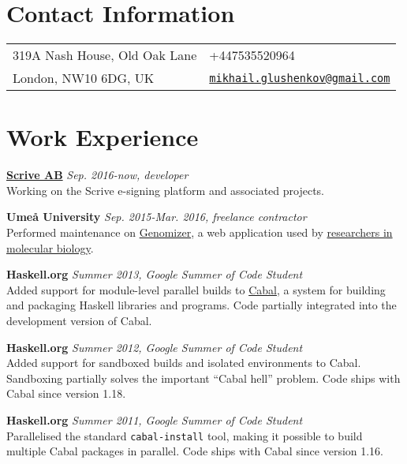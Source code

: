 \documentclass[margin,line]{res}
\begin{document}

\begin{resume}
\section{\sc Contact Information}
\vspace{.05in}
\begin{tabular}{@{}p{2in}p{4in}}
319A Nash House, Old Oak Lane&
+447535520964\\
London, NW10 6DG, UK&
\href{mailto:mikhail.glushenkov@gmail.com}
{\texttt{mikhail.glushenkov@gmail.com}}\\
\end{tabular}

\section{\sc Work Experience}

{\bf \href{http://scrive.com}{Scrive AB}} \hfill {\it Sep. 2016-now, developer}\\
Working on the Scrive e-signing platform and associated projects.

{\bf Umeå University} \hfill {\it Sep. 2015-Mar. 2016, freelance contractor}\\
Performed maintenance on \href{https://github.com/genomizer}{Genomizer}, a web
application used by \href{http://www.epicon.nu}{researchers in molecular biology}.

{\bf Haskell.org} \hfill {\it Summer 2013, Google Summer of Code Student}\\
Added support for module-level parallel builds to
\href{http://haskell.org/cabal}{Cabal}, a system for building and packaging
Haskell libraries and programs. Code partially integrated into the development
version of Cabal.

{\bf Haskell.org} \hfill {\it Summer 2012, Google Summer of Code Student}\\
Added support for sandboxed builds and isolated environments to
Cabal. Sandboxing partially solves the important ``Cabal hell'' problem. Code
ships with Cabal since version 1.18.

{\bf Haskell.org} \hfill {\it Summer 2011, Google Summer of Code Student}\\
Parallelised the standard \texttt{cabal-install} tool, making it possible to
build multiple Cabal packages in parallel. Code ships with Cabal since version
1.16.


\end{resume}
\end{document}
